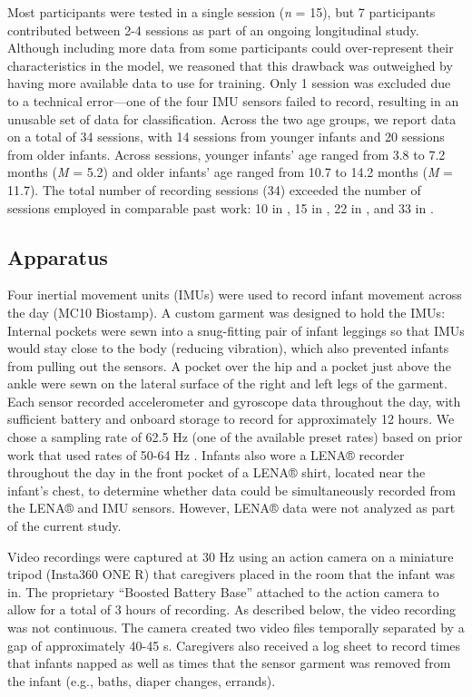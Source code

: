 \documentclass[
  man]{apa6}
\begin{document}
Most participants were tested in a single session (\emph{n} = 15), but 7 participants contributed between 2-4 sessions as part of an ongoing longitudinal study. Although including more data from some participants could over-represent their characteristics in the model, we reasoned that this drawback was outweighed by having more available data to use for training. Only 1 session was excluded due to a technical error---one of the four IMU sensors failed to record, resulting in an unusable set of data for classification. Across the two age groups, we report data on a total of 34 sessions, with 14 sessions from younger infants and 20 sessions from older infants. Across sessions, younger infants' age ranged from 3.8 to 7.2 months (\emph{M} = 5.2) and older infants' age ranged from 10.7 to 14.2 months (\emph{M} = 11.7). The total number of recording sessions (34) exceeded the number of sessions employed in comparable past work: 10 in \textcite{NamPark2013}, 15 in \textcite{FranchakScott2021}, 22 in \textcite{AiraksinenRasanen2020}, and 33 in \textcite{YaoPlotz2019}.

\hypertarget{apparatus}{%
\subsection{Apparatus}\label{apparatus}}

Four inertial movement units (IMUs) were used to record infant movement across the day (MC10 Biostamp). A custom garment was designed to hold the IMUs: Internal pockets were sewn into a snug-fitting pair of infant leggings so that IMUs would stay close to the body (reducing vibration), which also prevented infants from pulling out the sensors. A pocket over the hip and a pocket just above the ankle were sewn on the lateral surface of the right and left legs of the garment. Each sensor recorded accelerometer and gyroscope data throughout the day, with sufficient battery and onboard storage to record for approximately 12 hours. We chose a sampling rate of 62.5 Hz (one of the available preset rates) based on prior work that used rates of 50-64 Hz \autocite{FranchakScott2021,AiraksinenRasanen2020,YaoPlotz2019}. Infants also wore a LENA® recorder throughout the day in the front pocket of a LENA® shirt, located near the infant's chest, to determine whether data could be simultaneously recorded from the LENA® and IMU sensors. However, LENA® data were not analyzed as part of the current study.

Video recordings were captured at 30 Hz using an action camera on a miniature tripod (Insta360 ONE R) that caregivers placed in the room that the infant was in. The proprietary ``Boosted Battery Base'' attached to the action camera to allow for a total of 3 hours of recording. As described below, the video recording was not continuous. The camera created two video files temporally separated by a gap of approximately 40-45 s. Caregivers also received a log sheet to record times that infants napped as well as times that the sensor garment was removed from the infant (e.g., baths, diaper changes, errands).
\end{document}
